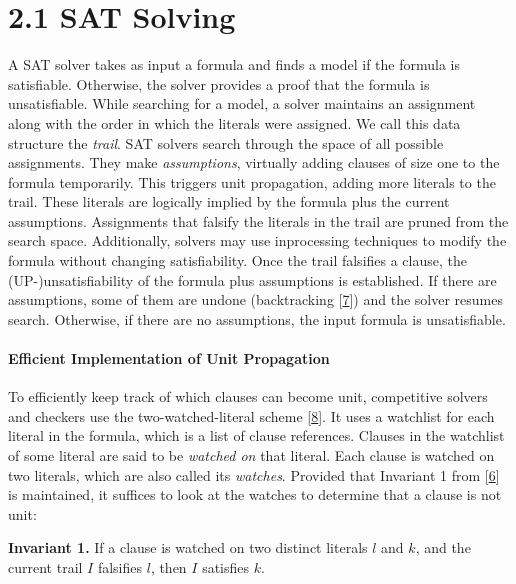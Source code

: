 \documentclass[
]{report}
\begin{document}
\hypertarget{sat-solving}{%
\section{2.1 SAT Solving}\label{sat-solving}}

A SAT solver takes as input a formula and finds a model if the formula
is satisfiable. Otherwise, the solver provides a proof that the formula
is unsatisfiable. While searching for a model, a solver maintains an
assignment along with the order in which the literals were assigned. We
call this data structure the \emph{trail}. SAT solvers search through
the space of all possible assignments. They make \emph{assumptions},
virtually adding clauses of size one to the formula temporarily. This
triggers unit propagation, adding more literals to the trail. These
literals are logically implied by the formula plus the current
assumptions. Assignments that falsify the literals in the trail are
pruned from the search space. Additionally, solvers may use inprocessing
techniques to modify the formula without changing satisfiability. Once
the trail falsifies a clause, the (UP-)unsatisfiability of the formula
plus assumptions is established. If there are assumptions, some of them
are undone (backtracking {[}\protect\hyperlink{ref-769433}{7}{]}) and
the solver resumes search. Otherwise, if there are no assumptions, the
input formula is unsatisfiable.

\paragraph{Efficient Implementation of Unit Propagation}

To efficiently keep track of which clauses can become unit, competitive
solvers and checkers use the two-watched-literal scheme
{[}\protect\hyperlink{ref-DBLP:confux2fdacux2fMoskewiczMZZM01}{8}{]}. It
uses a watchlist for each literal in the formula, which is a list of
clause references. Clauses in the watchlist of some literal are said to
be \emph{watched on} that literal. Each clause is watched on two
literals, which are also called its \emph{watches}. Provided that
Invariant 1 from
{[}\protect\hyperlink{ref-DBLP:confux2ffmcadux2fRebola-PardoC18}{6}{]}
is maintained, it suffices to look at the watches to determine that a
clause is not unit:

\textbf{Invariant 1.} If a clause is watched on two distinct literals
\(l\) and \(k\), and the current trail \(I\) falsifies \(l\), then \(I\)
satisfies \(k\).
\end{document}
